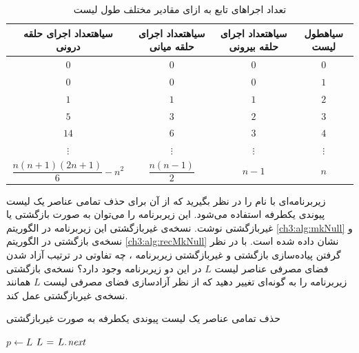 \begin{table}
\begin{center}
\small
\begin{tabular}{cccc}
\toprule[0.9pt]
‌سیاه{تعداد اجرای حلقه درونی} & ‌سیاه{تعداد اجرای حلقه میانی} & ‌سیاه{تعداد اجرای حلقه بیرونی} &  ‌سیاه{طول لیست}\\
\toprule[0.6pt]
$0$ & $0$ & $0$ & $0$\\
$0$ & $0$ & $0$ & $1$\\
$1$ & $1$ & $1$ & $2$\\
$5$ & $3$ & $2$ & $3$\\
$14$ & $6$ & $3$ & $4$\\
$\vdots$ & $\vdots$ & $\vdots$ & $\vdots$\\
$\dfrac{n(n+1)(2n+1)}{6}-n^2$ & $\dfrac{n(n-1)}{2}$ & $n-1$ & $n$\\
\bottomrule[0.9pt]
\end{tabular}
\end{center}
\caption{تعداد اجراهای تابع {} به ازای مقادیر مختلف طول لیست}\label{ch3:tbl:nextFunIters}
\end{table}


 زیربرنامه‌ای با نام {} را در نظر بگیرید که از آن برای حذف تمامی عناصر یک لیست پیوندی یکطرفه استفاده می‌شود. این زیربرنامه را می‌توان به صورت بازگشتی یا غیربازگشتی نوشت. نسخه‌ی غیربازگشتی این زیربرنامه در الگوریتم {\eqref{ch3:alg:mkNull}} و نسخه‌ی بازگشتی در الگوریتم {\eqref{ch3:alg:recMkNull}} نشان داده شده است. با در نظر گرفتن پیاده‌سازی بازگشتی و غیربازگشتی زیربرنامه {}، چه تفاوتی در ترتیب آزاد شدن فضای مصرفی عناصر لیست {$L$} در این دو زیربرنامه وجود دارد؟ نسخه‌ی بازگشتی زیربرنامه را به گونه‌ای تغییر دهید که از نظر آزادسازی فضای مصرفی لیست {$L$} همانند نسخه‌ی غیربازگشتی عمل کند.

\begin{algorithm}
\caption{حذف تمامی عناصر یک لیست پیوندی یکطرفه به صورت غیربازگشتی}\label{ch3:alg:mkNull}
\begin{latin}
\begin{algorithmic}[1]
				\State	$p \gets L$
				\State	$L \mathrel{\hspace{1pt}=\hspace{1pt}} L.\hspace*{1pt}\mathit{next}$
				\State	{}
		\EndWhile
\EndProcedure
\end{algorithmic}
\end{latin}
\end{algorithm}

